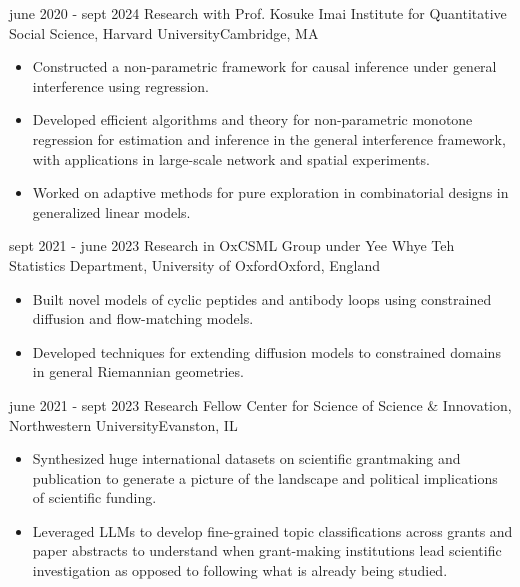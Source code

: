 \begin{cventries}
    \cventry
    {june 2020 - sept 2024}
    {Research with Prof. Kosuke Imai}
    {Institute for Quantitative Social Science, Harvard University}{Cambridge, MA}
    {\vspace{-4mm}\begin{itemize}[leftmargin=5mm]
       \item Constructed a non-parametric framework for causal inference under general interference using regression.
       \item Developed efficient algorithms and theory for non-parametric monotone regression for estimation and inference in the general interference framework, with applications in large-scale network and spatial experiments.
       \item Worked on adaptive methods for pure exploration in combinatorial designs in generalized linear models.
     \end{itemize}}\vspace{-4mm}

    \cventry
    {sept 2021 - june 2023}
    {Research in OxCSML Group under Yee Whye Teh}
    {Statistics Department, University of Oxford}{Oxford, England}
    {\vspace{-4mm}\begin{itemize}[leftmargin=5mm]
        \item Built novel models of cyclic peptides and antibody loops using constrained diffusion and flow-matching models.
        \item Developed techniques for extending diffusion models to constrained domains in general Riemannian geometries.
     \end{itemize}}\vspace{-4mm}

    \cventry
    {june 2021 - sept 2023}
    {Research Fellow}
    {Center for Science of Science \& Innovation, Northwestern University}{Evanston, IL}
    {\vspace{-4mm}\begin{itemize}[leftmargin=5mm]
        \item Synthesized huge international datasets on scientific grantmaking and publication to generate a picture of the landscape and political implications of scientific funding.
         \item Leveraged LLMs to develop fine-grained topic classifications across grants and paper abstracts to understand when grant-making institutions lead scientific investigation as opposed to following what is already being studied.
     \end{itemize}}\vspace{-4mm}


\end{cventries}
